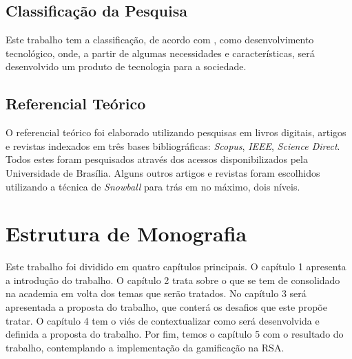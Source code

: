 \subsection{Classificação da Pesquisa}
\label{sub:classifica_o_da_pesquisa}
Este trabalho tem a classificação, de acordo com \cite{gil2010metodos}, como desenvolvimento tecnológico,
onde, a partir de algumas necessidades e características, será desenvolvido um produto
de tecnologia para a sociedade.

\subsection{Referencial Teórico}
\label{sub:referencial_te_rico}
O referencial teórico foi elaborado utilizando pesquisas em livros digitais, artigos e
revistas indexados em três bases bibliográficas: \textit{Scopus}, \textit{IEEE}, \textit{Science Direct}. Todos estes
foram pesquisados através dos acessos disponibilizados pela Universidade de Brasília.
Alguns outros artigos e revistas foram escolhidos utilizando a técnica de
\textit{Snowball} para trás em no máximo, dois níveis.


\section{Estrutura de Monografia}
Este trabalho foi dividido em quatro capítulos principais. O capítulo 1 apresenta a introdução
do trabalho. O capítulo 2 trata sobre o que se tem de consolidado na academia em volta
dos temas que serão tratados. No capítulo 3 será apresentada a proposta do trabalho, que conterá
os desafios que este propõe tratar. O capítulo 4 tem o viés de contextualizar como será
desenvolvida e definida a proposta do trabalho. Por fim, temos o capítulo 5 com o resultado do
trabalho, contemplando a implementação da gamificação na RSA.
